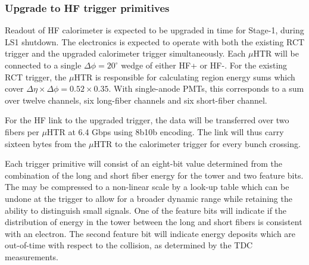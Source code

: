 


\subsubsection{Upgrade to HF trigger primitives\label{calo:hf}}

Readout of HF calorimeter is expected to be upgraded in time for Stage-1, during LS1 shutdown.
The \utca electronics is expected to operate with both the
existing RCT trigger and the upgraded calorimeter trigger
simultaneously. Each $\mu$HTR will be connected to a single $\Delta\phi =
20^\circ$ wedge of either HF+ or HF-.  For the existing RCT trigger,
the $\mu$HTR is responsible for calculating region energy sums which cover
$\Delta \eta \times \Delta \phi = 0.52 \times 0.35$.  With
single-anode PMTs, this corresponds to a sum over twelve channels, six
long-fiber channels and six short-fiber channel.  

For the HF link to the upgraded trigger, the data will be transferred
over two fibers per $\mu$HTR at 6.4 Gbps using 8b10b encoding.  The link
will thus carry sixteen bytes from the $\mu$HTR to the calorimeter trigger
for every bunch crossing.  

Each trigger
primitive will consist of an eight-bit \ET value determined from the
combination of the long and short fiber energy for the tower and two
feature bits.  The \ET may be compressed to a non-linear scale by a
look-up table which can be undone at the trigger to allow for a broader
dynamic range while retaining the ability to distinguish small
signals.  One of the feature bits will indicate if the distribution of
energy in the tower between the long and short fibers is consistent
with an electron.  The second feature bit will indicate energy deposits which
are out-of-time with respect to the collision, as determined by the
TDC measurements.

